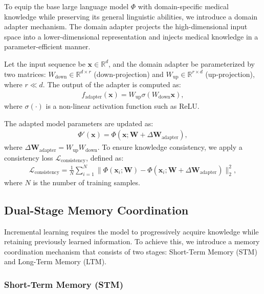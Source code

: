 To equip the base large language model \( \Phi \) with domain-specific medical knowledge while preserving its general linguistic abilities, we introduce a domain adapter mechanism. The domain adapter projects the high-dimensional input space into a lower-dimensional representation and injects medical knowledge in a parameter-efficient manner.

Let the input sequence be \( \mathbf{x} \in \mathbb{R}^d \), and the domain adapter be parameterized by two matrices: \( W_{\text{down}} \in \mathbb{R}^{d \times r} \) (down-projection) and \( W_{\text{up}} \in \mathbb{R}^{r \times d} \) (up-projection), where \( r \ll d \). The output of the adapter is computed as:
\begin{align}
f_{\text{adapter}}(\mathbf{x}) = W_{\text{up}} \sigma \left( W_{\text{down}} \mathbf{x} \right),
\end{align}
where \( \sigma(\cdot) \) is a non-linear activation function such as ReLU.

The adapted model parameters are updated as:
\begin{align}
\Phi'(\mathbf{x}) = \Phi(\mathbf{x}; \mathbf{W} + \Delta \mathbf{W}_{\text{adapter}}),
\end{align}
where \( \Delta \mathbf{W}_{\text{adapter}} = W_{\text{up}} W_{\text{down}} \). To ensure knowledge consistency, we apply a consistency loss \( \mathcal{L}_{\text{consistency}} \), defined as:
\begin{align}
\mathcal{L}_{\text{consistency}} = \frac{1}{N} \sum_{i=1}^N \| \Phi(\mathbf{x}_i; \mathbf{W}) - \Phi(\mathbf{x}_i; \mathbf{W} + \Delta \mathbf{W}_{\text{adapter}}) \|_2^2,
\end{align}
where \( N \) is the number of training samples.

\subsection{Dual-Stage Memory Coordination}

Incremental learning requires the model to progressively acquire knowledge while retaining previously learned information. To achieve this, we introduce a memory coordination mechanism that consists of two stages: Short-Term Memory (STM) and Long-Term Memory (LTM).

\subsubsection{Short-Term Memory (STM)}

